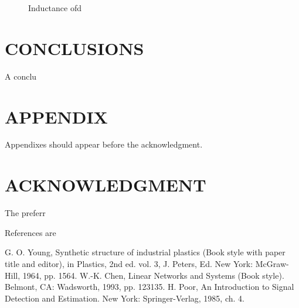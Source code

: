\documentclass[letterpaper, 10 pt, conference]{ieeeconf}  %
\begin{document}
   \begin{figure}[thpb]
      \centering
      \caption{Inductance ofd}
      \label{figurelabel}
   \end{figure}




\section{CONCLUSIONS}

A conclu

\addtolength{\textheight}{-12cm}   %







\section*{APPENDIX}

Appendixes should appear before the acknowledgment.

\section*{ACKNOWLEDGMENT}

The preferr




References are
\begin{thebibliography}{99}

 G. O. Young, Synthetic structure of industrial plastics (Book style with paper title and editor), 	in Plastics, 2nd ed. vol. 3, J. Peters, Ed.  New York: McGraw-Hill, 1964, pp. 1564.
 W.-K. Chen, Linear Networks and Systems (Book style).	Belmont, CA: Wadsworth, 1993, pp. 123135.
 H. Poor, An Introduction to Signal Detection and Estimation.   New York: Springer-Verlag, 1985, ch. 4.




\end{thebibliography}
\end{document}
